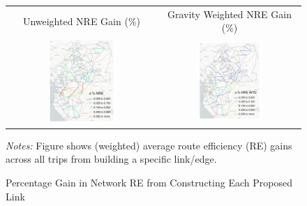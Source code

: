 \documentclass[a4paper]{article}
\begin{document}
\begin{figure}[h!] %
\centering
\caption{\label{fig:NRE_DA_TAN} Percentage Gain in Network RE from Constructing Each Proposed Link}
\vspace{2mm}
\begin{tabular}{cc}
Unweighted NRE Gain (\%) & Gravity Weighted NRE Gain (\%) \\ %
\includegraphics[width=0.48\textwidth]{"../figures/PE/trans_CEMAC_network_NRE_gain_perc.pdf"} &
\includegraphics[width=0.48\textwidth]{"../figures/PE/trans_CEMAC_network_NRE_wtd_gain_perc.pdf"} \\ [-0.2em]
\end{tabular}
\scriptsize 
\emph{Notes:} Figure shows (weighted) average route efficiency (RE) gains across all trips from building a specific link/edge. 
\end{figure}
\end{document}
